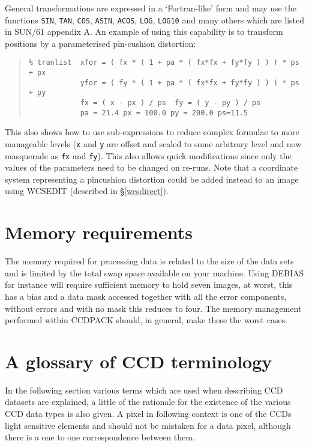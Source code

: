 \documentclass[twoside,11pt]{article}
\newcommand{\hyperref}[4]{#2\ref{#4}#3}
\newcommand{\htmlref}[2]{#1}
\newcommand{\latexhtml}[2]{#1}
\newcommand{\xlabel}[1]{}
\renewcommand{\_}{\texttt{\symbol{95}}}
\newcommand{\ttsize}{\latexhtml{\small}{}}
\newenvironment{myquote}{\begin{quote}\ttsize}{\end{quote}}
\newcommand{\text}[1]{{\ttsize \tt #1}}
\newcommand{\xroutine}[1]{\htmlref{{\sc #1}}{#1}}
\begin{document}
General transformations are expressed in a `Fortran-like' form and may
use the functions \text{SIN}, \text{TAN}, \text{COS},
\text{ASIN},
\text{ACOS}, \text{LOG}, \text{LOG10} and many others  which are
listed in SUN/61 appendix A. An example of using this capability is to
transform positions by a parameterised pin-cushion distortion:
\begin{myquote}
\begin{verbatim}
% tranlist  xfor = ( fx * ( 1 + pa * ( fx*fx + fy*fy ) ) ) * ps + px
            yfor = ( fy * ( 1 + pa * ( fx*fx + fy*fy ) ) ) * ps + py
            fx = ( x - px ) / ps  fy = ( y - py ) / ps
            pa = 21.4 px = 100.0 py = 200.0 ps=11.5
\end{verbatim}
\end{myquote}
This also shows how to use sub-expressions to reduce complex formulae to
more manageable levels (\text{x} and \text{y} are offset and scaled
to some arbitrary level and now masquerade as \text{fx} and
\text{fy}). This also allows quick modifications since only the values
of the parameters need to be changed on re-runs.
Note that a coordinate system representing a pincushion distortion 
could be added instead to an image using \xroutine{WCSEDIT} 
(described \hyperref{elsewhere}{in \S}{}{wcsdirect}).



\newpage
\section{Memory requirements}
The memory required for processing data is related to the size of the
data sets and is limited by the total swap space available on your
machine. Using \xroutine{DEBIAS} for instance will require sufficient
memory to hold seven images, at worst, this has a bias and a data mask
accessed together with all the error components, without errors and with
no mask this reduces to four.  The memory management performed within
CCDPACK should, in general, make these the worst cases.

\section{A glossary of CCD terminology \xlabel{glossary} \label{app:glos}}
\label{donothing}
In the following section various terms which are used when describing
CCD datasets are explained, a little of the rationale for the
existence of the various CCD data types is also given. A pixel in
following context is one of the CCDs light sensitive elements and
should not be mistaken for a data pixel, although there is a one to
one correspondence between them.
\end{document}
